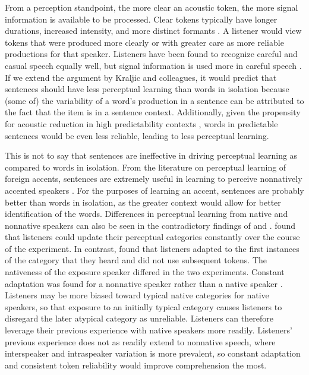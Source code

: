 From a perception standpoint, the more clear an acoustic token, the more signal information is available to be processed.
Clear tokens typically have longer durations, increased intensity, and more distinct formants \citep{Krause2004}.
A listener would view tokens that were produced more clearly or with greater care as more reliable productions for that speaker.
Listeners have been found to recognize careful and casual speech equally well, but signal information is used more in careful speech \citep{Sumner2015}.
If we extend the argument by Kraljic and colleagues, it would predict that sentences should have less perceptual learning than words in isolation because (some of) the variability of a word's production in a sentence can be attributed to the fact that the item is in a sentence context.
Additionally, given the propensity for acoustic reduction in high predictability contexts \citep{Scarborough2010}, words in predictable sentences would be even less reliable, leading to less perceptual learning.

This is not to say that sentences are ineffective in driving perceptual learning as compared to words in isolation.
From the literature on perceptual learning of foreign accents, sentences are extremely useful in learning to perceive nonnatively accented speakers \citep{Bradlow2008}.
For the purposes of learning an accent, sentences are probably better than words in isolation, as the greater context would allow for better identification of the words.
Differences in perceptual learning from native and nonnative speakers can also be seen in the contradictory findings of \citet{Sumner2011} and \citet{Kraljic2008}.
\citet{Sumner2011} found that listeners could update their perceptual categories constantly over the course of the experiment.
In contrast, \citet{Kraljic2008} found that listeners adapted to the first instances of the category that they heard and did not use subsequent tokens.
The nativeness of the exposure speaker differed in the two experiments.
Constant adaptation was found for a nonnative speaker \citep{Sumner2011} rather than a native speaker \citep{Kraljic2008}.
Listeners may be more biased toward typical native categories for native speakers, so that exposure to an initially typical category causes listeners to disregard the later atypical category as unreliable.
Listeners can therefore leverage their previous experience with native speakers more readily.
Listeners' previous experience does not as readily extend to nonnative speech, where interspeaker and intraspeaker variation is more prevalent, so constant adaptation and consistent token reliability would improve comprehension the most.

